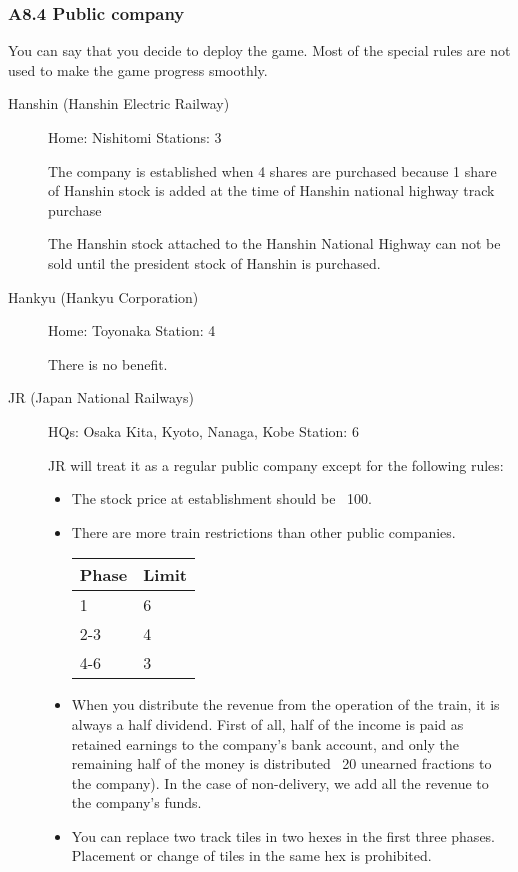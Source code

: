 \documentclass{article}
\begin{document}
\begin{CJK}{UTF8}{min}
\subsubsection*{A8.4 Public company}
You can say that you decide to deploy the game. Most of the special
rules are not used to make the game progress smoothly.
\begin{description}
\item[Hanshin (Hanshin Electric Railway)] Home: Nishitomi Stations: 3

  The company is established when 4 shares are purchased because 1
  share of Hanshin stock is added at the time of Hanshin national
  highway track purchase

  The Hanshin stock attached to the Hanshin National Highway can not
  be sold until the president stock of Hanshin is purchased.

\item[Hankyu (Hankyu Corporation)] Home: Toyonaka Station: 4

  There is no benefit.

\item[JR (Japan National Railways)]

HQs: Osaka Kita, Kyoto, Nanaga, Kobe Station: 6

JR will treat it as a regular public company except for the following rules:
\begin{itemize}
\item The stock price at establishment should be \ 100.
\item There are more train restrictions than other public companies.

\begin{tabular}{ll}
  Phase & Limit \\
  \hline
  1 &  6 \\
  2-3 & 4 \\
  4-6 & 3
\end{tabular}
\item When you distribute the revenue from the operation of the train,
  it is always a half dividend. First of all, half of the income is
  paid as retained earnings to the company's bank account, and only
  the remaining half of the money is distributed \ 20 unearned
  fractions to the company). In the case of non-delivery, we add all
  the revenue to the company's funds.
\item You can replace two track tiles in two hexes in the first three
  phases. Placement or change of tiles in the same hex is prohibited.
\end{itemize}


\end{description}
\end{CJK}
\end{document}
